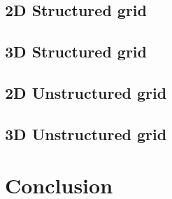 \documentclass[
fontsize=11pt,
paper=a4,
numbers=noenddot
]{scrartcl}
\begin{document}
\subsection{2D Structured grid}
\subsection{3D Structured grid}
\subsection{2D Unstructured grid}
\subsection{3D Unstructured grid}

\section{Conclusion}

\end{document}
